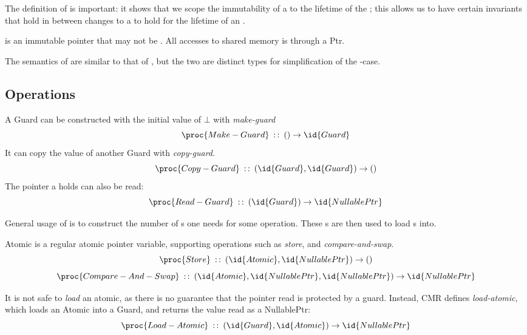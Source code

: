 The definition of  is important: it shows that we scope the immutability of a
 to the lifetime of the ; this allows us to have certain invariants
that hold in between changes to a  to hold for the lifetime of an .

\begin{definition}
   is an immutable pointer that may not be \nullptr. All accesses to shared memory is
  through a Ptr.
\end{definition}
The semantics of  are similar to that of , but the two are distinct types
for simplification of the \nullptr-case.


\subsection{Operations}

A Guard can be constructed with the initial value of $\bot$ with \emph{make-guard}
\begin{equation}\label{eq:make-guard}
  \proc{Make-Guard}\typeof{} () \to \id{Guard}
\end{equation}
It can copy the value of another Guard with \emph{copy-guard}.
\begin{equation}\label{eq:copy-guard}
  \proc{Copy-Guard}\typeof{} (\id{Guard}, \id{Guard}) \to ()
\end{equation}
The pointer a  holds can also be read:
\begin{equation}\label{eq:read-guard}
  \proc{Read-Guard}\typeof{} (\id{Guard}) \to \id{NullablePtr}
\end{equation}

General usage of  is to construct the number of s one needs for some operation.
These s are then used to load s into.

Atomic is a regular atomic pointer variable, supporting operations such as \emph{store}, and
\emph{compare-and-swap}.
\begin{equation}\label{eq:atomic-store}
  \proc{Store}\typeof{} (\id{Atomic}, \id{NullablePtr}) \to ()
\end{equation}
\begin{equation}\label{eq:atomic-cas}
  \proc{Compare-And-Swap}\typeof (\id{Atomic}, \id{NullablePtr}, \id{NullablePtr}) \to
  \id{NullablePtr}
\end{equation}

It is not safe to \emph{load} an atomic, as there is no guarantee that the
pointer read is protected by a guard. Instead, CMR defines \emph{load-atomic}, which loads an
Atomic into a Guard, and returns the value read as a NullablePtr:
\begin{equation}\label{eq:load-atomic}
  \proc{Load-Atomic}\typeof{} (\id{Guard}, \id{Atomic}) \to \id{NullablePtr}
\end{equation}

